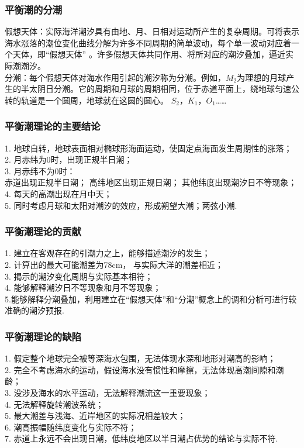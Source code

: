 \documentclass[a4paper,12pt]{article}
\begin{document}
    \subsubsection{平衡潮的分潮}
    假想天体：实际海洋潮汐具有由地、月、日相对运动所产生的复杂周期。可将表示海水涨落的潮位变化曲线分解为许多不同周期的简单波动，每个单一波动对应着一个天体，即“假想天体” 。许多假想天体共同作用、将所对应的潮汐叠加，逼近实际潮潮汐。\\
    分潮：每个假想天体对海水作用引起的潮汐称为分潮。例如，$M_2$为理想的月球产生的半太阴日分潮。它的周期和月球的周期相同，位于赤道平面上，绕地球匀速公转的轨道是一个圆周，地球就在这圆的圆心。 $S_2，K_1，O_1$……\\
    \subsubsection{平衡潮理论的主要结论}
    1. 地球自转，地球表面相对椭球形海面运动，使固定点海面发生周期性的涨落；\\
    2. 月赤纬为0时，出现正规半日潮；\\
    3. 月赤纬不为0时：\\
    赤道出现正规半日潮；
    高纬地区出现正规日潮；
    其他纬度出现潮汐日不等现象；\\
    4. 每天的高潮出现在月中天；\\
    5. 同时考虑月球和太阳对潮汐的效应，形成朔望大潮；两弦小潮.
    \subsubsection{平衡潮理论的贡献}
    1. 建立在客观存在的引潮力之上，能够描述潮汐的发生；\\
    2. 计算出的最大可能潮差为78cm， 与实际大洋的潮差相近；\\
    3. 揭示的潮汐变化周期与实际基本相符；\\
    4. 能够解释潮汐日不等现象和月不等现象；\\
    5.能够解释分潮叠加，利用建立在“假想天体”和“分潮”概念上的调和分析可进行较准确的潮汐预报.
    \subsubsection{平衡潮理论的缺陷}
    1. 假定整个地球完全被等深海水包围，无法体现水深和地形对潮高的影响；\\
    2. 完全不考虑海水的运动，假设海水没有惯性和摩擦，无法体现高潮间隙和潮龄；\\
    3. 没涉及海水的水平运动，无法解释潮流这一重要现象；\\
    4. 无法解释旋转潮波系统；\\
    5. 最大潮差与浅海、近岸地区的实际况相差较大；\\
    6. 潮高振幅随纬度变化与实际不符；\\
    7. 赤道上永远不会出现日潮，低纬度地区以半日潮占优势的结论与实际不符.
\end{document}
